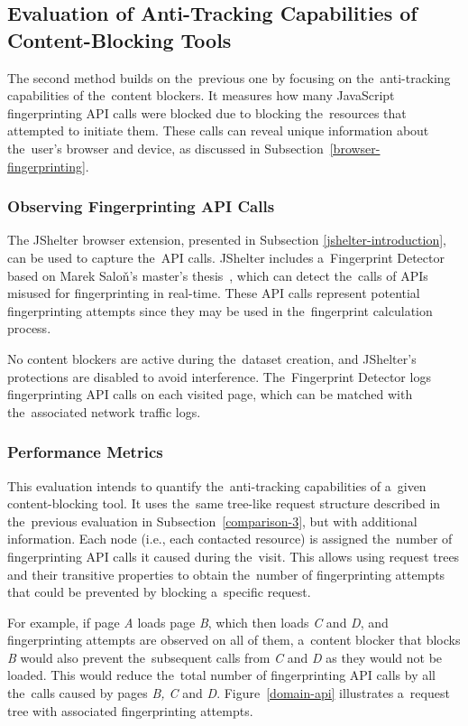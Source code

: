 \subsection{Evaluation of Anti-Tracking Capabilities of Content-Blocking Tools}
\label{content-blocking-design}
The second method builds on the~previous one by focusing on the~anti-tracking capabilities of the~content blockers. It measures how many JavaScript fingerprinting API calls were blocked due to blocking the~resources that attempted to initiate them. These calls can reveal unique information about the~user’s browser and device, as discussed in Subsection~\ref{browser-fingerprinting}.


\subsubsection{Observing Fingerprinting API Calls}
The JShelter browser extension, presented in Subsection \ref{jshelter-introduction}, can be used to capture the~API calls. JShelter includes a~Fingerprint Detector based on Marek Saloň’s master’s thesis~\cite{salon-mit}, which can detect the~calls of APIs misused for fingerprinting in real-time. These API calls represent potential fingerprinting attempts since they may be used in the~fingerprint calculation process.

No content blockers are active during the~dataset creation, and JShelter’s protections are disabled to avoid interference. The~Fingerprint Detector logs fingerprinting API calls on each visited page, which can be matched with the~associated network traffic logs.


\subsubsection{Performance Metrics}
This evaluation intends to quantify the~anti-tracking capabilities of a~given content-blocking tool. It uses the~same tree-like request structure described in the~previous evaluation in Subsection~\ref{comparison-3}, but with additional information. Each node (i.e., each contacted resource) is assigned the~number of fingerprinting API calls it caused during the~visit. This allows using request trees and their transitive properties to obtain the~number of fingerprinting attempts that could be prevented by blocking a~specific request.

For example, if page \emph{A} loads page \emph{B}, which then loads \emph{C} and \emph{D}, and fingerprinting attempts are observed on all of them, a~content blocker that blocks \emph{B} would also prevent the~subsequent calls from \emph{C} and \emph{D} as they would not be loaded. This would reduce the~total number of fingerprinting API calls by all the~calls caused by pages \emph{B, C} and \emph{D}. Figure~\ref{domain-api} illustrates a~request tree with associated fingerprinting attempts.


